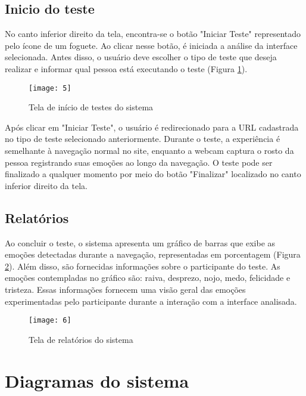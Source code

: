\clearpage
\subsection{Inicio do teste}

No canto inferior direito da tela, encontra-se o botão "Iniciar Teste" representado pelo ícone de um foguete. Ao clicar nesse botão, é iniciada a análise da interface selecionada. Antes disso, o usuário deve escolher o tipo de teste que deseja realizar e informar qual pessoa está executando o teste (Figura \ref{fig:5}).

\begin{figure}[h]
  \caption{Tela de início de testes do sistema}
  \centering
  \texttt{[image: 5]}
  \label{fig:5}
\end{figure}
\FloatBarrier

Após clicar em "Iniciar Teste", o usuário é redirecionado para a URL cadastrada no tipo de teste selecionado anteriormente. Durante o teste, a experiência é semelhante à navegação normal no site, enquanto a webcam captura o rosto da pessoa registrando suas emoções ao longo da navegação. O teste pode ser finalizado a qualquer momento por meio do botão "Finalizar" localizado no canto inferior direito da tela.

\clearpage
\subsection{Relatórios}

Ao concluir o teste, o sistema apresenta um gráfico de barras que exibe as emoções detectadas durante a navegação, representadas em porcentagem (Figura \ref{fig:6}). Além disso, são fornecidas informações sobre o participante do teste. As emoções contempladas no gráfico são: raiva, desprezo, nojo, medo, felicidade e tristeza. Essas informações fornecem uma visão geral das emoções experimentadas pelo participante durante a interação com a interface analisada.

\begin{figure}[h]
  \caption{Tela de relatórios do sistema}
  \centering
  \texttt{[image: 6]}
  \label{fig:6}
\end{figure}
\FloatBarrier

\clearpage
\section{Diagramas do sistema}

